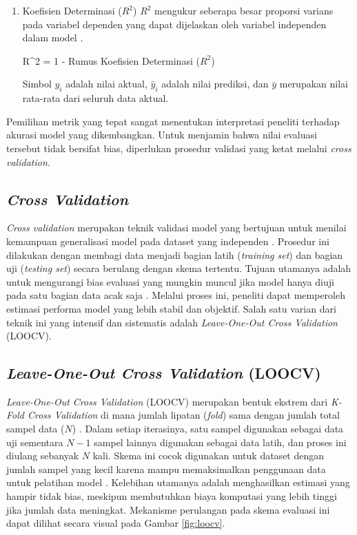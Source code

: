 \begin{enumerate}
    \item Koefisien Determinasi ($R^2$)
    $R^2$ mengukur seberapa besar proporsi varians pada variabel dependen yang dapat dijelaskan oleh variabel independen dalam model \cite{james2023introduction}.
    \begin{equationcaptioned}[eq:r2]{
        R^2 = 1 - 
    }{
        Rumus Koefisien Determinasi ($R^2$)
    }
    \end{equationcaptioned}
    Simbol $y_i$ adalah nilai aktual, $\hat{y}_i$ adalah nilai prediksi, dan $\bar{y}$ merupakan nilai rata-rata dari seluruh data aktual.
\end{enumerate}

Pemilihan metrik yang tepat sangat menentukan interpretasi peneliti terhadap akurasi model yang dikembangkan. Untuk menjamin bahwa nilai evaluasi tersebut tidak bersifat bias, diperlukan prosedur validasi yang ketat melalui \textit{cross validation}.

\subsection{\textit{Cross Validation}}
\textit{Cross validation} merupakan teknik validasi model yang bertujuan untuk menilai kemampuan generalisasi model pada dataset yang independen \cite{hastie2009elements}. Prosedur ini dilakukan dengan membagi data menjadi bagian latih (\textit{training set}) dan bagian uji (\textit{testing set}) secara berulang dengan skema tertentu. Tujuan utamanya adalah untuk mengurangi bias evaluasi yang mungkin muncul jika model hanya diuji pada satu bagian data acak saja \cite{james2021islr}. Melalui proses ini, peneliti dapat memperoleh estimasi performa model yang lebih stabil dan objektif. Salah satu varian dari teknik ini yang intensif dan sistematis adalah \textit{Leave-One-Out Cross Validation} (LOOCV).

\subsection{\textit{Leave-One-Out Cross Validation} (LOOCV)}
\textit{Leave-One-Out Cross Validation} (LOOCV) merupakan bentuk ekstrem dari \textit{K-Fold Cross Validation} di mana jumlah lipatan (\textit{fold}) sama dengan jumlah total sampel data ($N$) \cite{james2021islr}. Dalam setiap iterasinya, satu sampel digunakan sebagai data uji sementara $N-1$ sampel lainnya digunakan sebagai data latih, dan proses ini diulang sebanyak $N$ kali. Skema ini cocok digunakan untuk dataset dengan jumlah sampel yang kecil karena mampu memaksimalkan penggunaan data untuk pelatihan model \cite{james2021islr}. Kelebihan utamanya adalah menghasilkan estimasi yang hampir tidak bias, meskipun membutuhkan biaya komputasi yang lebih tinggi jika jumlah data meningkat. Mekanisme perulangan pada skema evaluasi ini dapat dilihat secara visual pada Gambar \ref{fig:loocv}.

